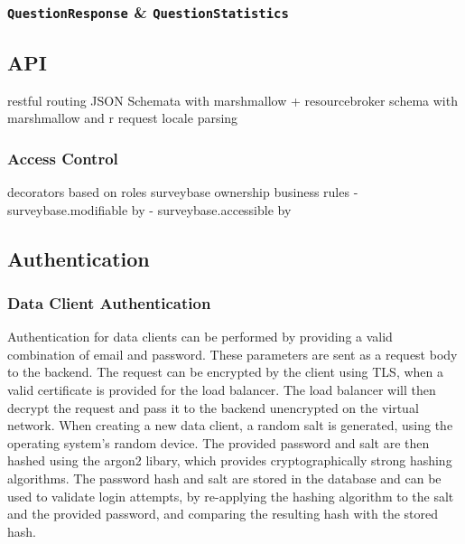 \documentclass[a4paper,11pt]{article}
\def\inline{\lstinline[basicstyle=\ttfamily,keywordstyle={}]}
\begin{document}
            \subsubsection{\inline{QuestionResponse} \& \inline{QuestionStatistics}}

        \subsection{API}
            restful routing
            JSON Schemata with marshmallow + resourcebroker
            schema with marshmallow and r
            request locale parsing
            \subsubsection{Access Control}
                decorators based on roles
                surveybase ownership business rules
                    - surveybase.modifiable by
                    - surveybase.accessible by

        \subsection{Authentication}
            \subsubsection{Data Client Authentication}
                Authentication for data clients can be performed by providing
                a valid combination of email and password. These parameters
                are sent as a request body to the backend. The request
                can be encrypted by the client using TLS, when a valid
                certificate is provided for the load balancer. The load balancer
                will then decrypt the request and pass it to the backend unencrypted
                on the virtual network. When creating a new data client,
                a random salt is generated, using the operating system's
                random device. The provided password and salt are then hashed
                using the argon2 libary, which provides cryptographically
                strong hashing algorithms. The password hash and salt are stored in
                the database and can be used to validate login attempts,
                by re-applying the hashing algorithm to the salt and the provided
                password, and comparing the resulting hash with the stored hash.
\end{document}
